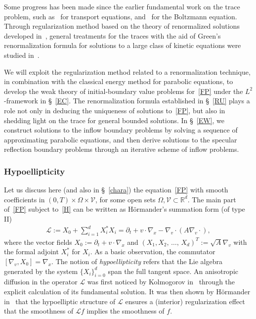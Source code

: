 \documentclass[AHL,Unicode,longabstracts,published]{cedram}
\newcommand*\p{\partial}
\newcommand*\R {\mathbb{R}}
\newcommand*\V {\mathcal{V}}
\newcommand{\scL}{\mathscr{L}}
\begin{document}
Some progress has been made since the earlier fundamental work on the trace problem, such as~\cite{Bardos,Cessenat2} for transport equations, and~\cite{Ham} for the Boltzmann equation. Through regularization method based on the theory of renormalized solutions developed in~\cite{DPLode}, general treatments for the traces with the aid of Green's renormalization formula for solutions to a large class of kinetic equations were studied in~\cite{Mischler1,Mischler3}.

We will exploit the regularization method related to a renormalization technique, in combination with the classical energy method for parabolic equations, to develop the weak theory of initial-boundary value problems for~\eqref{FP} under the $L^2$-framework in \S~\ref{EC}. The renormalization formula established in \S~\ref{RU} plays a role not only in deducing the uniqueness of solutions to~\eqref{FP}, but also in shedding light on the trace for general bounded solutions. In \S~\ref{EW}, we construct solutions to the inflow boundary problems by solving a sequence of approximating parabolic equations, and then derive solutions to the specular reflection boundary problems through an iterative scheme of inflow problems.

\subsubsection{Hypoellipticity}

Let us discuss here (and also in \S~\ref{chara}) the equation~\eqref{FP} with smooth coefficients in $(0,T)\times\Omega\times\V$, for some open sets $\Omega,\V\subset\R^d$. The main part of~\eqref{FP} subject to~\eqref{H} can be written as H\"ormander's summation form (of type II)
\begin{align*}
\scL:=X_0+\sum\nolimits_{i=1}^d X_i^*X_i=\partial_t+v\cdot\nabla_x-\nabla_v\cdot(A\nabla_v\cdot),
\end{align*}
where the vector fields $X_0:=\p_t+v\cdot\nabla_x$ and $(X_1,X_2,\,\dots,\,X_d)^T:=\sqrt{A}\nabla_v$ with the formal adjoint $X_i^*$ for $X_i$. As a basic observation, the commutator $[\nabla_v,X_0]=\nabla_x$. The notion of \emph{hypoellipticity} refers that the Lie algebra generated by the system $\{X_i\}_{i=0}^d$ span the full tangent space. An anisotropic diffusion in the operator $\scL$ was first noticed by Kolmogorov in~\cite{Kol} through the explicit calculation of its fundamental solution. It was then shown by H\"ormander in~\cite{Ho} that the hypoelliptic structure of $\scL$ ensures a (interior) regularization effect that the smoothness of $\scL f$ implies the smoothness of $f$.
\end{document}
